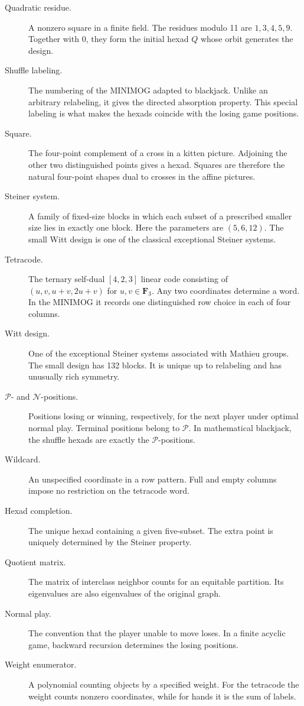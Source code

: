 \documentclass[12pt,letterpaper]{article}
\theoremstyle{definition}\newtheorem{example}[theorem]{Example}
\numberwithin{equation}{section}
\newcommand{\F}{\mathbf F}
\begin{document}
\begin{description}
\item[Quadratic residue.] A nonzero square in a finite field. The residues modulo 11 are $1,3,4,5,9$. Together with $0$, they form the initial hexad $Q$ whose orbit generates the design.

\item[Shuffle labeling.] The numbering of the MINIMOG adapted to blackjack. Unlike an arbitrary relabeling, it gives the directed absorption property. This special labeling is what makes the hexads coincide with the losing game positions.

\item[Square.] The four-point complement of a cross in a kitten picture. Adjoining the other two distinguished points gives a hexad. Squares are therefore the natural four-point shapes dual to crosses in the affine pictures.

\item[Steiner system.] A family of fixed-size blocks in which each subset of a prescribed smaller size lies in exactly one block. Here the parameters are $(5,6,12)$. The small Witt design is one of the classical exceptional Steiner systems.

\item[Tetracode.] The ternary self-dual $[4,2,3]$ linear code consisting of $(u,v,u+v,2u+v)$ for $u,v\in\F_3$. Any two coordinates determine a word. In the MINIMOG it records one distinguished row choice in each of four columns.

\item[Witt design.] One of the exceptional Steiner systems associated with Mathieu groups. The small design has 132 blocks. It is unique up to relabeling and has unusually rich symmetry.

\item[$\mathcal P$- and $\mathcal N$-positions.] Positions losing or winning, respectively, for the next player under optimal normal play. Terminal positions belong to $\mathcal P$. In mathematical blackjack, the shuffle hexads are exactly the $\mathcal P$-positions.
\item[Wildcard.] An unspecified coordinate in a row pattern. Full and empty columns impose no restriction on the tetracode word.
\item[Hexad completion.] The unique hexad containing a given five-subset. The extra point is uniquely determined by the Steiner property.
\item[Quotient matrix.] The matrix of interclass neighbor counts for an equitable partition. Its eigenvalues are also eigenvalues of the original graph.
\item[Normal play.] The convention that the player unable to move loses. In a finite acyclic game, backward recursion determines the losing positions.
\item[Weight enumerator.] A polynomial counting objects by a specified weight. For the tetracode the weight counts nonzero coordinates, while for hands it is the sum of labels.
\end{description}
\end{document}
